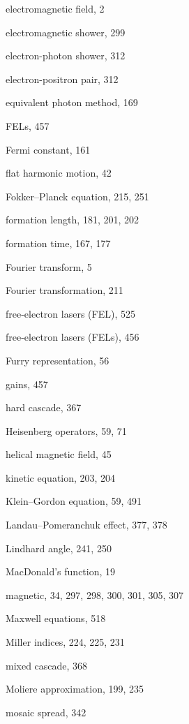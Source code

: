\begin{theindex}
  \indexspace

  \item electromagnetic field, 2
  \item electromagnetic shower, 299
  \item electron-photon shower, 312
  \item electron-positron pair, 312
  \item equivalent photon method, 169

  \indexspace

  \item FELs, 457
  \item Fermi constant, 161
  \item flat harmonic motion, 42
  \item Fokker--Planck equation, 215, 251
  \item formation length, 181, 201, 202
  \item formation time, 167, 177
  \item Fourier transform, 5
  \item Fourier transformation, 211
  \item free-electron lasers (FEL), 525
  \item free-electron lasers (FELs), 456
  \item Furry representation, 56

  \indexspace

  \item gains, 457

  \indexspace

  \item hard cascade, 367
  \item Heisenberg operators, 59, 71
  \item helical magnetic field, 45

  \indexspace

  \item kinetic equation, 203, 204
  \item Klein--Gordon equation, 59, 491

  \indexspace

  \item Landau--Pomeranchuk effect, 377, 378
  \item Lindhard angle, 241, 250

  \indexspace

  \item MacDonald's function, 19
  \item magnetic, 34, 297, 298, 300, 301, 305, 307
  \item Maxwell equations, 518
  \item Miller indices, 224, 225, 231
  \item mixed cascade, 368
  \item Moliere approximation, 199, 235
  \item mosaic spread, 342


\end{theindex}
